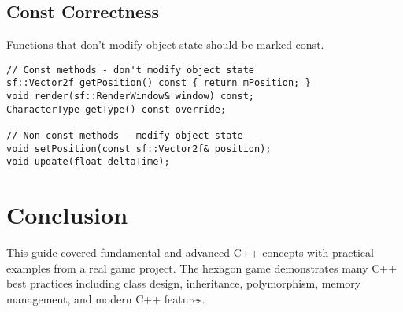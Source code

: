 \documentclass{article}
\begin{document}
\subsection{Const Correctness}

Functions that don't modify object state should be marked const.

\begin{lstlisting}[caption=Const Correctness Example]
// Const methods - don't modify object state
sf::Vector2f getPosition() const { return mPosition; }
void render(sf::RenderWindow& window) const;
CharacterType getType() const override;

// Non-const methods - modify object state
void setPosition(const sf::Vector2f& position);
void update(float deltaTime);
\end{lstlisting}

\section{Conclusion}

This guide covered fundamental and advanced C++ concepts with practical examples from a real game project. The hexagon game demonstrates many C++ best practices including class design, inheritance, polymorphism, memory management, and modern C++ features.
\end{document}
